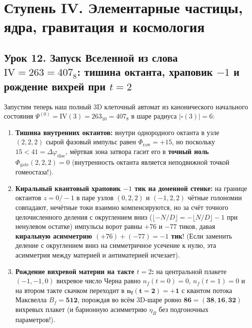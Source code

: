 \chapter{Ступень IV. Элементарные частицы, ядра, гравитация и космология}
\label{ch:course-stage4-particles-cosmos}

\section{Урок 12. Запуск Вселенной из слова \texorpdfstring{$\mathrm{IV} = 263 = 407_8$}{IV = 263 = 407\_8}: тишина октанта, храповик \texorpdfstring{$-1$}{-1} и рождение вихрей при \texorpdfstring{$t = 2$}{t = 2}}

Запустим теперь наш полный 3D клеточный автомат из канонического начального состояния $\Psi^{(0)} = \mathrm{IV}(3) = 263_{10} = 407_8$ в шаре радиуса $|\square(3)| = 6$:
\begin{enumerate}[label=\textbf{(\alph*)},noitemsep]
\item \textbf{Тишина внутренних октантов:} внутри однородного октанта в узле $(2,2,2)$ сырой фазовый импульс равен $\Phi_{\mathrm{raw}} = +15$, но поскольку $15 < 41 = \Delta\varphi_{\mathrm{disc}}$, мёртвая зона затвора гасит его в \textbf{точный ноль $\Phi_{\mathrm{gate}}(2,2,2) = 0$} (внутренность октанта является неподвижной точкой гомеостаза!).
\item \textbf{Киральный квантовый храповик $-1$ тик на доменной стенке:} на границе октантов $z = 0 / -1$ в паре узлов $(0,2,2)$ и $(-1,2,2)$ чётные голономии совпадают, нечётные токи взаимно компенсируются, но за счёт точного целочисленного деления с округлением вниз ($\lfloor -N/D\rfloor = -\lfloor N/D\rfloor - 1$ при ненулевом остатке) импульсы ворот равны $+76$ и $-77$ тиков, давая \textbf{киральную асимметрию $(+76) + (-77) = -1$ тик}! (Если заменить деление с округлением вниз на симметричное усечение к нулю, эта асимметрия между материей и антиматерией исчезает).
\item \textbf{Рождение вихревой материи на такте $t = 2$:} на центральной плакете $(-1,-1,0)$ вихревое число Черна равно $n_f(t=0) = 0$, $n_f(t=1) = 0$ и на втором такте скачком переходит в $\mathbf{n_f(t=2) = +1}$ с квантом потока Максвелла $B_f = \mathbf{512}$, порождая во всём 3D-шаре ровно $\mathbf{86 = (38, 16, 32)}$ вихревых плакет (и барионную асимметрию $\eta_B$ без подгоночных параметров!).
\end{enumerate}

